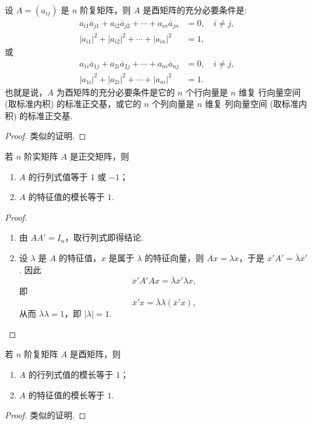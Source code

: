 \documentclass[../../main.tex]{subfiles}
\begin{document}
\begin{theorem}\label{theorem:酉矩阵的基本性质1}
设 $A = (a_{ij})$ 是 $n$ 阶复矩阵，则 $A$ 是酉矩阵的充分必要条件是:
\begin{align*}
a_{i1}\overline{a}_{j1} + a_{i2}\overline{a}_{j2} + \cdots + a_{in}\overline{a}_{jn} &= 0,\quad i \neq j,\\
|a_{i1}|^2 + |a_{i2}|^2 + \cdots + |a_{in}|^2 &= 1,
\end{align*}
或
\begin{align*}
a_{1i}\overline{a}_{1j} + a_{2i}\overline{a}_{2j} + \cdots + a_{ni}\overline{a}_{nj} &= 0,\quad i \neq j,\\
|a_{1i}|^2 + |a_{2i}|^2 + \cdots + |a_{ni}|^2 &= 1.
\end{align*}
也就是说，$A$ 为酉矩阵的充分必要条件是它的 $n$ 个行向量是 $n$ 维复 行向量空间 (取标准内积) 的标准正交基，或它的 $n$ 个列向量是 $n$ 维复 列向量空间 (取标准内积) 的标准正交基.
\end{theorem}
\begin{proof}
类似的证明.

\end{proof}

\begin{theorem}\label{theorem:正交矩阵的行列式和特征值}
若 $n$ 阶实矩阵 $A$ 是正交矩阵，则
\begin{enumerate}[(1)]
\item $A$ 的行列式值等于 $1$ 或 $-1$；

\item $A$ 的特征值的模长等于 $1$.
\end{enumerate}
\end{theorem}
\begin{proof}
\begin{enumerate}[(1)]
\item 由 $AA' = I_n$，取行列式即得结论.

\item 设 $\lambda$ 是 $A$ 的特征值，$x$ 是属于 $\lambda$ 的特征向量，则 $Ax = \lambda x$，于是 $\overline{x}'A' = \overline{\lambda}\overline{x}'$. 因此
\[
\overline{x}'A'Ax = \overline{\lambda}\overline{x}'\lambda x,
\]
即
\[
\overline{x}'x = \overline{\lambda}\lambda(\overline{x}'x),
\]
从而 $\overline{\lambda}\lambda = 1$，即 $|\lambda| = 1$. 
\end{enumerate}

\end{proof}

\begin{theorem}\label{theorem:酉矩阵的行列式和特征值}
若 $n$ 阶复矩阵 $A$ 是酉矩阵，则
\begin{enumerate}
\item $A$ 的行列式值的模长等于 $1$；

\item $A$ 的特征值的模长等于 $1$.
\end{enumerate}
\end{theorem}
\begin{proof}
类似的证明.

\end{proof}
\end{document}
